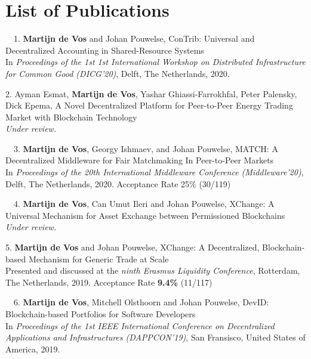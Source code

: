 \chapter*{List of Publications}
\label{publications}

\begin{etaremune}{%
\item[\faFileTextO~~1.] \textbf{Martijn de Vos} and Johan Pouwelse, ConTrib: Universal and Decentralized Accounting in Shared-Resource Systems\\
In \emph{Proceedings of the 1st 1st International Workshop on Distributed Infrastructure for Common Good (DICG'20)}, Delft, The Netherlands, 2020.

\item[2.] Ayman Esmat, \textbf{Martijn de Vos}, Yashar Ghiassi-Farrokhfal, Peter Palensky, Dick Epema, A Novel Decentralized Platform for Peer-to-Peer Energy Trading Market with Blockchain Technology\\
\emph{Under review.}
		
\item[\faFileTextO~~3.] \textbf{Martijn de Vos}, Georgy Ishmaev, and Johan Pouwelse, MATCH: A Decentralized Middleware for Fair Matchmaking In
Peer-to-Peer Markets\\
In \emph{Proceedings of the 20th International Middleware Conference (Middleware'20)}, Delft, The Netherlands, 2020. Acceptance Rate 25\% (30/119)

\item[\faFileTextO~~4.] \textbf{Martijn de Vos}, Can Umut Ileri and Johan Pouwelse, XChange: A Universal Mechanism for Asset Exchange between Permissioned Blockchains\\
\emph{Under review.}

\item[5.] \textbf{Martijn de Vos} and Johan Pouwelse, XChange: A Decentralized, Blockchain-based Mechanism for Generic Trade at Scale\\
Presented and discussed at the \emph{ninth Erasmus Liquidity Conference}, Rotterdam, The Netherlands, 2019. Acceptance Rate \textbf{9.4\%} (11/117)

\item[\faFileTextO~~6.] \textbf{Martijn de Vos}, Mitchell Olsthoorn and Johan Pouwelse, DevID: Blockchain-based Portfolios for Software Developers\\
In \emph{Proceedings of the 1st IEEE International Conference on Decentralized Applications and Infrastructures (DAPPCON'19)}, San Fransisco, United States of America, 2019.

}
\end{etaremune}
